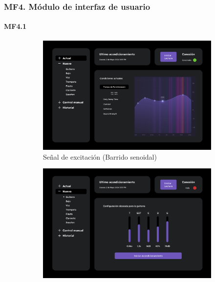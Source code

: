 \subsubsection{MF4. Módulo de interfaz de usuario}

\paragraph{MF4.1}


\begin{figure}[!htb]
    \centering
     \begin{subfigure}{0.3\textwidth}
        \centering
        \includegraphics[width=\linewidth]{imagenes/Landing.png}
        \caption{\footnotesize Señal de excitación (Barrido senoidal)}
        \label{fig:sub1}
    \end{subfigure}
    \hfill
    \begin{subfigure}{0.3\textwidth}
        \centering
        \includegraphics[width=\linewidth]{imagenes/Guitarra.png}

\end{subfigure}
\end{figure}
